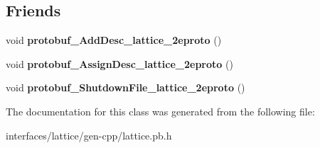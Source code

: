 \subsection*{Friends}
\begin{DoxyCompactItemize}
\item 
\hypertarget{classlattice_1_1Lattice__Edge_a19e63fb37025879e023cad88064187cf}{
void {\bfseries protobuf\_\-AddDesc\_\-lattice\_\-2eproto} ()}
\label{classlattice_1_1Lattice__Edge_a19e63fb37025879e023cad88064187cf}

\item 
\hypertarget{classlattice_1_1Lattice__Edge_a3b0386e09a9fefcf1bdce658cfc480b2}{
void {\bfseries protobuf\_\-AssignDesc\_\-lattice\_\-2eproto} ()}
\label{classlattice_1_1Lattice__Edge_a3b0386e09a9fefcf1bdce658cfc480b2}

\item 
\hypertarget{classlattice_1_1Lattice__Edge_a3c7b187721d0704ceb19ff889729d35a}{
void {\bfseries protobuf\_\-ShutdownFile\_\-lattice\_\-2eproto} ()}
\label{classlattice_1_1Lattice__Edge_a3c7b187721d0704ceb19ff889729d35a}

\end{DoxyCompactItemize}


The documentation for this class was generated from the following file:\begin{DoxyCompactItemize}
\item 
interfaces/lattice/gen-\/cpp/lattice.pb.h\end{DoxyCompactItemize}

